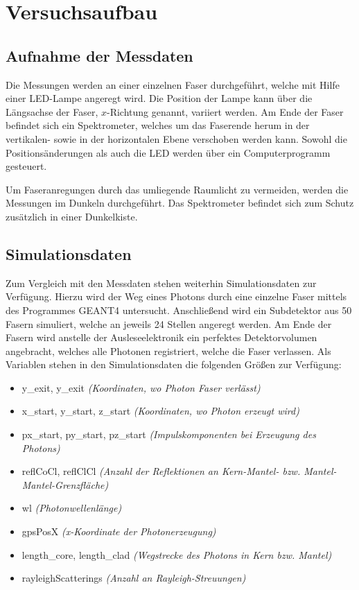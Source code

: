\section{Versuchsaufbau}

\subsection{Aufnahme der Messdaten}
Die Messungen werden an einer einzelnen Faser durchgeführt, welche mit Hilfe einer LED-Lampe angeregt wird. Die Position der Lampe kann über die Längsachse der Faser, $x$-Richtung genannt, variiert werden. Am Ende der Faser befindet sich ein Spektrometer, welches um das Faserende herum in der vertikalen- sowie in der horizontalen Ebene verschoben werden kann.
Sowohl die Positionsänderungen als auch die LED werden über ein Computerprogramm gesteuert.

Um Faseranregungen durch das umliegende Raumlicht zu vermeiden, werden die Messungen im Dunkeln durchgeführt. Das Spektrometer befindet sich zum Schutz zusätzlich in einer Dunkelkiste.

\subsection{Simulationsdaten}
Zum Vergleich mit den Messdaten stehen weiterhin Simulationsdaten zur Verfügung. Hierzu wird der Weg eines Photons durch eine einzelne Faser mittels des Programmes GEANT4 untersucht. Anschließend wird ein Subdetektor aus 50 Fasern simuliert, welche an jeweils 24 Stellen angeregt werden. Am Ende der Fasern wird anstelle der Ausleseelektronik ein perfektes Detektorvolumen angebracht, welches alle Photonen registriert, welche die Faser verlassen.
Als Variablen stehen in den Simulationsdaten die folgenden Größen zur Verfügung:
\begin{itemize}
    \item y\_{exit}, y\_{exit} \textit{(Koordinaten, wo Photon Faser verlässt)}
    \item x\_{start}, y\_{start}, z\_{start} \textit{(Koordinaten, wo Photon erzeugt wird)}
    \item px\_{start}, py\_{start}, pz\_{start} \textit{(Impulskomponenten bei Erzeugung des Photons)}
    \item reflCoCl, reflClCl \textit{(Anzahl der Reflektionen an Kern-Mantel- bzw. Mantel-Mantel-Grenzfläche)}
    \item wl \textit{(Photonwellenlänge)}
    \item gpsPosX \textit{(x-Koordinate der Photonerzeugung)}
    \item length\_core, length\_clad \textit{(Wegstrecke des Photons in Kern bzw. Mantel)}
    \item rayleighScatterings \textit{(Anzahl an Rayleigh-Streuungen)}
\end{itemize}

